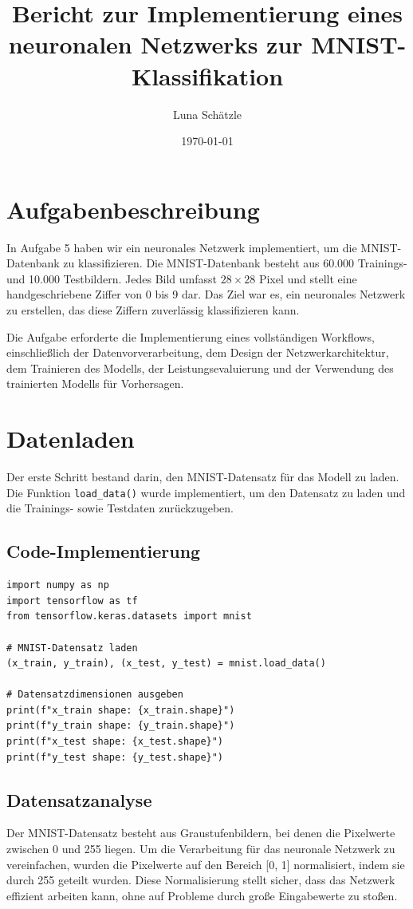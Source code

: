 \documentclass[12pt,a4paper]{article}
\title{\textbf{Bericht zur Implementierung eines neuronalen Netzwerks zur MNIST-Klassifikation}}
\author{Luna Schätzle}
\date{\today}
\begin{document}
\maketitle

\section*{Aufgabenbeschreibung}
In Aufgabe 5 haben wir ein neuronales Netzwerk implementiert, um die MNIST-Datenbank zu klassifizieren. Die MNIST-Datenbank besteht aus 60.000 Trainings- und 10.000 Testbildern. Jedes Bild umfasst $28 \times 28$ Pixel und stellt eine handgeschriebene Ziffer von 0 bis 9 dar. Das Ziel war es, ein neuronales Netzwerk zu erstellen, das diese Ziffern zuverlässig klassifizieren kann.

Die Aufgabe erforderte die Implementierung eines vollständigen Workflows, einschließlich der Datenvorverarbeitung, dem Design der Netzwerkarchitektur, dem Trainieren des Modells, der Leistungsevaluierung und der Verwendung des trainierten Modells für Vorhersagen.

\section*{Datenladen}
Der erste Schritt bestand darin, den MNIST-Datensatz für das Modell zu laden. Die Funktion \texttt{load\_data()} wurde implementiert, um den Datensatz zu laden und die Trainings- sowie Testdaten zurückzugeben.

\subsection*{Code-Implementierung}
\begin{lstlisting}
import numpy as np
import tensorflow as tf
from tensorflow.keras.datasets import mnist

# MNIST-Datensatz laden
(x_train, y_train), (x_test, y_test) = mnist.load_data()

# Datensatzdimensionen ausgeben
print(f"x_train shape: {x_train.shape}")
print(f"y_train shape: {y_train.shape}")
print(f"x_test shape: {x_test.shape}")
print(f"y_test shape: {y_test.shape}")
\end{lstlisting}

\subsection*{Datensatzanalyse}
Der MNIST-Datensatz besteht aus Graustufenbildern, bei denen die Pixelwerte zwischen 0 und 255 liegen. Um die Verarbeitung für das neuronale Netzwerk zu vereinfachen, wurden die Pixelwerte auf den Bereich [0, 1] normalisiert, indem sie durch 255 geteilt wurden. Diese Normalisierung stellt sicher, dass das Netzwerk effizient arbeiten kann, ohne auf Probleme durch große Eingabewerte zu stoßen.
\end{document}
